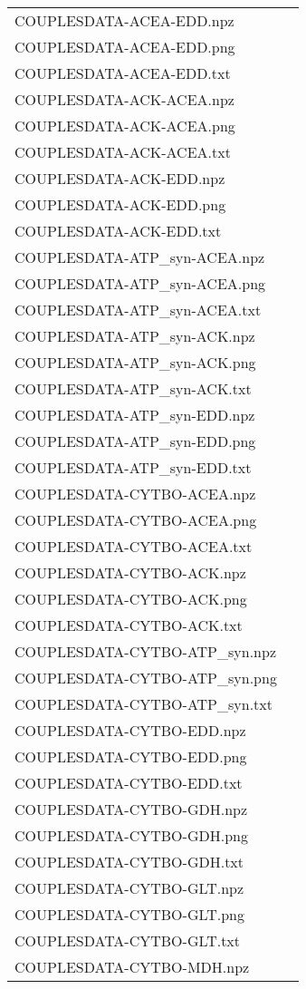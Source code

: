 \documentclass[a4paper, parskip=full]{scrreprt}
\begin{document}
\begin{longtable}{ll}
COUPLESDATA-ACEA-EDD.npz\\
COUPLESDATA-ACEA-EDD.png\\
COUPLESDATA-ACEA-EDD.txt\\
COUPLESDATA-ACK-ACEA.npz\\
COUPLESDATA-ACK-ACEA.png\\
COUPLESDATA-ACK-ACEA.txt\\
COUPLESDATA-ACK-EDD.npz\\
COUPLESDATA-ACK-EDD.png\\
COUPLESDATA-ACK-EDD.txt\\
COUPLESDATA-ATP\_syn-ACEA.npz\\
COUPLESDATA-ATP\_syn-ACEA.png\\
COUPLESDATA-ATP\_syn-ACEA.txt\\
COUPLESDATA-ATP\_syn-ACK.npz\\
COUPLESDATA-ATP\_syn-ACK.png\\
COUPLESDATA-ATP\_syn-ACK.txt\\
COUPLESDATA-ATP\_syn-EDD.npz\\
COUPLESDATA-ATP\_syn-EDD.png\\
COUPLESDATA-ATP\_syn-EDD.txt\\
COUPLESDATA-CYTBO-ACEA.npz\\
COUPLESDATA-CYTBO-ACEA.png\\
COUPLESDATA-CYTBO-ACEA.txt\\
COUPLESDATA-CYTBO-ACK.npz\\
COUPLESDATA-CYTBO-ACK.png\\
COUPLESDATA-CYTBO-ACK.txt\\
COUPLESDATA-CYTBO-ATP\_syn.npz\\
COUPLESDATA-CYTBO-ATP\_syn.png\\
COUPLESDATA-CYTBO-ATP\_syn.txt\\
COUPLESDATA-CYTBO-EDD.npz\\
COUPLESDATA-CYTBO-EDD.png\\
COUPLESDATA-CYTBO-EDD.txt\\
COUPLESDATA-CYTBO-GDH.npz\\
COUPLESDATA-CYTBO-GDH.png\\
COUPLESDATA-CYTBO-GDH.txt\\
COUPLESDATA-CYTBO-GLT.npz\\
COUPLESDATA-CYTBO-GLT.png\\
COUPLESDATA-CYTBO-GLT.txt\\
COUPLESDATA-CYTBO-MDH.npz\\

\end{longtable}
\end{document}
